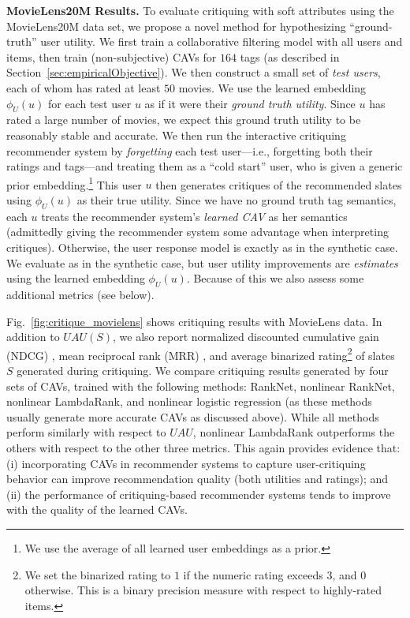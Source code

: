 \documentclass[manuscript,screen,nonacm]{acmart}
\newcommand{\1}{{\mathbf 1}}
\newcommand{\UAU}{\mathit{UAU}}
\theoremstyle{TheoremNum}
\begin{document}
\vskip 2mm
\noindent
\textbf{MovieLens20M Results.} \hspace*{2mm}
To evaluate critiquing with soft attributes using the MovieLens20M data set, we propose a novel method for hypothesizing ``ground-truth'' user utility. We first train a collaborative filtering model with all users and items, then train (non-subjective) CAVs for $164$ tags (as described in Section~\ref{sec:empiricalObjective}). We then construct a small set of \emph{test users}, each of whom has rated at least $50$ movies. We use the learned embedding $\phi_U(u)$ for each test user $u$ as if it were their \emph{ground truth utility}. Since $u$ has rated a large number of movies, we expect this ground truth utility to be reasonably stable and accurate. We then run the interactive critiquing recommender system by \emph{forgetting} each test user---i.e., forgetting both their ratings and tags---and treating them as a ``cold start'' user, who is given a generic prior embedding.\footnote{We use the average of all learned user embeddings as a prior.} This user $u$ then generates critiques of the recommended slates using $\phi_U(u)$ as their true utility. Since we have no ground truth tag semantics, each $u$ treats the recommender system's \emph{learned CAV} as her semantics (admittedly giving the recommender system some advantage when interpreting critiques). Otherwise, the user response model is exactly as in the synthetic case. We evaluate as in the synthetic case, but user utility improvements are \emph{estimates} using the learned embedding $\phi_U(u)$. Because of this we also assess some additional metrics (see below).

Fig.~\ref{fig:critique_movielens} shows critiquing results with MovieLens data. In addition to $\UAU(S)$, we also report normalized discounted cumulative gain (NDCG)  \cite{valizadegan2009learning}, mean reciprocal rank (MRR) \cite{mcfee2010metric}, and average binarized rating\footnote{We set the binarized rating to $1$ if the numeric rating exceeds $3$, and $0$ otherwise. This is a binary precision measure with respect to highly-rated items.} \cite{rashid2002getting} of slates $S$ generated during critiquing. We compare critiquing results generated by four sets of CAVs, trained with the following methods: RankNet, nonlinear RankNet, nonlinear LambdaRank, and nonlinear logistic regression (as these methods usually generate more accurate CAVs as discussed above).
While all methods perform similarly with respect to $\UAU$, nonlinear LambdaRank outperforms the others with respect to the other three metrics. This again provides evidence that: (i) incorporating CAVs in recommender systems to capture user-critiquing behavior can improve recommendation quality (both utilities and ratings); and (ii) the performance of critiquing-based recommender systems tends to improve with the quality of the learned CAVs.
\end{document}

